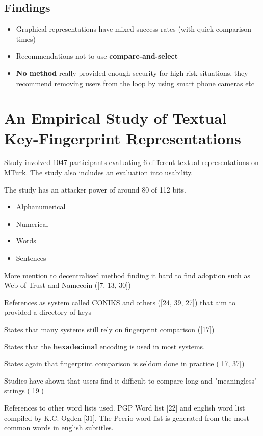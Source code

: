 \subsection{Findings}

\begin{itemize}
    \item Graphical representations have mixed success rates (with quick comparison times)
    \item Recommendations not to use \textbf{compare-and-select}
    \item \textbf{No method} really provided enough security for high risk situations, they recommend removing users from the loop by using smart phone cameras etc
\end{itemize}


\section{An Empirical Study of Textual Key-Fingerprint Representations}

Study involved 1047 participants evaluating 6 different textual representations on MTurk. The study also includes an evaluation into usability.

The study has an attacker power of around 80 of 112 bits.

\begin{itemize}
    \item Alphanumerical
    \item Numerical
    \item Words
    \item Sentences
\end{itemize}

More mention to decentralised method finding it hard to find adoption such as Web of Trust and Namecoin ([7, 13, 30])

References as system called CONIKS and others ([24, 39, 27]) that aim to provided a directory of keys

States that many systems still rely on fingerprint comparison ([17])

States that the \textbf{hexadecimal} encoding is used in most systems. 

States again that fingerprint comparison is seldom done in practice ([17, 37])

Studies have shown that users find it difficult to compare long and "meaningless" strings ([19])

References to other word lists used. PGP Word list [22] and english word list compiled by K.C. Ogden [31]. The Peerio word list is generated from the most common words in english subtitles.

